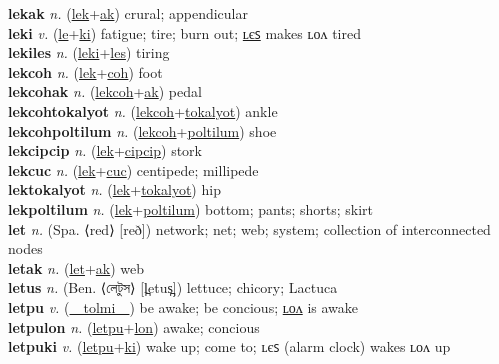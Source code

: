 \textbf{lekak} \textit{n.} (\hyperref[lek]{lek}+\hyperref[ak]{ak})
crural; appendicular \label{lekak} \\
\textbf{leki} \textit{v.} (\hyperref[le]{le}+\hyperref[ki]{ki})
fatigue; tire; burn out; \hyperref[lekiles]{ʟєꜱ} makes ʟᴏᴧ tired \label{leki} \\
\textbf{lekiles} \textit{n.} (\hyperref[leki]{leki}+\hyperref[les]{les})
tiring \label{lekiles} \\
\textbf{lekcoh} \textit{n.} (\hyperref[lek]{lek}+\hyperref[coh]{coh})
foot \label{lekcoh} \\
\textbf{lekcohak} \textit{n.} (\hyperref[lekcoh]{lekcoh}+\hyperref[ak]{ak})
pedal \label{lekcohak} \\
\textbf{lekcohtokalyot} \textit{n.} (\hyperref[lekcoh]{lekcoh}+\hyperref[tokalyot]{tokalyot})
ankle \label{lekcohtokalyot} \\
\textbf{lekcohpoltilum} \textit{n.} (\hyperref[lekcoh]{lekcoh}+\hyperref[poltilum]{poltilum})
shoe \label{lekcohpoltilum} \\
\textbf{lekcipcip} \textit{n.} (\hyperref[lek]{lek}+\hyperref[cipcip]{cipcip})
stork \label{lekcipcip} \\
\textbf{lekcuc} \textit{n.} (\hyperref[lek]{lek}+\hyperref[cuc]{cuc})
centipede; millipede \label{lekcuc} \\
\textbf{lektokalyot} \textit{n.} (\hyperref[lek]{lek}+\hyperref[tokalyot]{tokalyot})
hip \label{lektokalyot} \\
\textbf{lekpoltilum} \textit{n.} (\hyperref[lek]{lek}+\hyperref[poltilum]{poltilum})
bottom; pants; shorts; skirt \label{lekpoltilum} \\
\textbf{let} \textit{n.} (Spa. ⟨red⟩ [reð])
network; net; web; system; collection of interconnected nodes \label{let} \\
\textbf{letak} \textit{n.} (\hyperref[let]{let}+\hyperref[ak]{ak})
web \label{letak} \\
\textbf{letus} \textit{n.} (Ben. ⟨লেটুস⟩ [l̪etus̪])
lettuce; chicory; Lactuca \label{letus} \\
\textbf{letpu} \textit{v.} (\hyperref[tolmi]{~~tolmi~~})
be awake; be concious; \hyperref[letpulon]{ʟᴏᴧ} is awake \label{letpu} \\
\textbf{letpulon} \textit{n.} (\hyperref[letpu]{letpu}+\hyperref[lon]{lon})
awake; concious \label{letpulon} \\
\textbf{letpuki} \textit{v.} (\hyperref[letpu]{letpu}+\hyperref[ki]{ki})
wake up; come to; ʟєꜱ (alarm clock) wakes ʟᴏᴧ up \label{letpuki} \\
